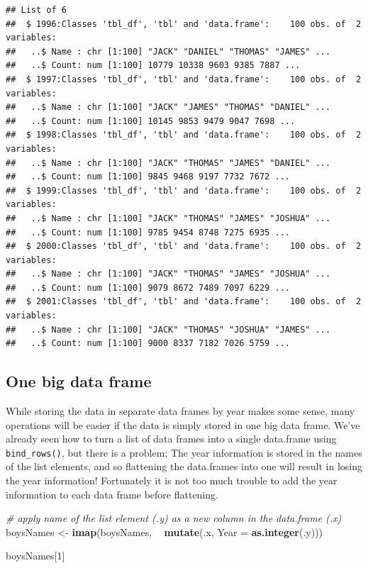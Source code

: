 \documentclass[]{book}
\newenvironment{Shaded}{\begin{snugshade}}{\end{snugshade}}
\newcommand{\CommentTok}[1]{\textcolor[rgb]{0.56,0.35,0.01}{\textit{#1}}}
\newcommand{\DataTypeTok}[1]{\textcolor[rgb]{0.13,0.29,0.53}{#1}}
\newcommand{\DecValTok}[1]{\textcolor[rgb]{0.00,0.00,0.81}{#1}}
\newcommand{\KeywordTok}[1]{\textcolor[rgb]{0.13,0.29,0.53}{\textbf{#1}}}
\newcommand{\NormalTok}[1]{#1}
\newcommand{\OperatorTok}[1]{\textcolor[rgb]{0.81,0.36,0.00}{\textbf{#1}}}
\newcommand{\StringTok}[1]{\textcolor[rgb]{0.31,0.60,0.02}{#1}}
\begin{document}
\begin{verbatim}
## List of 6
##  $ 1996:Classes 'tbl_df', 'tbl' and 'data.frame':    100 obs. of  2 variables:
##   ..$ Name : chr [1:100] "JACK" "DANIEL" "THOMAS" "JAMES" ...
##   ..$ Count: num [1:100] 10779 10338 9603 9385 7887 ...
##  $ 1997:Classes 'tbl_df', 'tbl' and 'data.frame':    100 obs. of  2 variables:
##   ..$ Name : chr [1:100] "JACK" "JAMES" "THOMAS" "DANIEL" ...
##   ..$ Count: num [1:100] 10145 9853 9479 9047 7698 ...
##  $ 1998:Classes 'tbl_df', 'tbl' and 'data.frame':    100 obs. of  2 variables:
##   ..$ Name : chr [1:100] "JACK" "THOMAS" "JAMES" "DANIEL" ...
##   ..$ Count: num [1:100] 9845 9468 9197 7732 7672 ...
##  $ 1999:Classes 'tbl_df', 'tbl' and 'data.frame':    100 obs. of  2 variables:
##   ..$ Name : chr [1:100] "JACK" "THOMAS" "JAMES" "JOSHUA" ...
##   ..$ Count: num [1:100] 9785 9454 8748 7275 6935 ...
##  $ 2000:Classes 'tbl_df', 'tbl' and 'data.frame':    100 obs. of  2 variables:
##   ..$ Name : chr [1:100] "JACK" "THOMAS" "JAMES" "JOSHUA" ...
##   ..$ Count: num [1:100] 9079 8672 7489 7097 6229 ...
##  $ 2001:Classes 'tbl_df', 'tbl' and 'data.frame':    100 obs. of  2 variables:
##   ..$ Name : chr [1:100] "JACK" "THOMAS" "JOSHUA" "JAMES" ...
##   ..$ Count: num [1:100] 9000 8337 7182 7026 5759 ...
\end{verbatim}

\hypertarget{one-big-data-frame}{%
\subsection{One big data frame}\label{one-big-data-frame}}

While storing the data in separate data frames by year makes some sense,
many operations will be easier if the data is simply stored in one big
data frame. We've already seen how to turn a list of data frames into a
single data.frame using \texttt{bind\_rows()}, but there is a problem; The year
information is stored in the names of the list elements, and so
flattening the data.frames into one will result in losing the year
information! Fortunately it is not too much trouble to add the year
information to each data frame before flattening.

\begin{Shaded}
\begin{Highlighting}[]
\CommentTok{# apply name of the list element (.y) as a new column in the data.frame (.x)}
\NormalTok{boysNames <-}\StringTok{ }\KeywordTok{imap}\NormalTok{(boysNames, }\OperatorTok{~}\StringTok{ }\KeywordTok{mutate}\NormalTok{(.x, }\DataTypeTok{Year =} \KeywordTok{as.integer}\NormalTok{(.y)))}

\NormalTok{boysNames[}\DecValTok{1}\NormalTok{]}
\end{Highlighting}
\end{Shaded}
\end{document}
